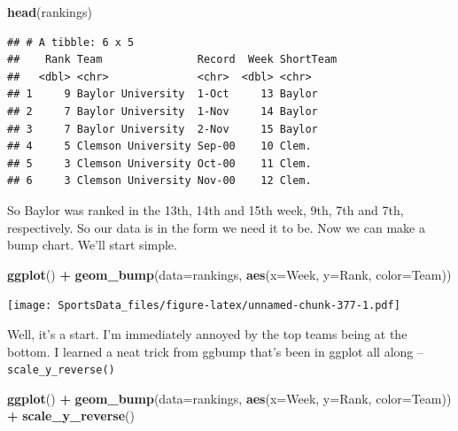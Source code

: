 \documentclass[
]{book}
\newenvironment{Shaded}{\begin{snugshade}}{\end{snugshade}}
\newcommand{\DataTypeTok}[1]{\textcolor[rgb]{0.13,0.29,0.53}{#1}}
\newcommand{\KeywordTok}[1]{\textcolor[rgb]{0.13,0.29,0.53}{\textbf{#1}}}
\newcommand{\NormalTok}[1]{#1}
\newcommand{\OperatorTok}[1]{\textcolor[rgb]{0.81,0.36,0.00}{\textbf{#1}}}
\newcommand{\StringTok}[1]{\textcolor[rgb]{0.31,0.60,0.02}{#1}}
\begin{document}
\begin{Shaded}
\begin{Highlighting}[]
\KeywordTok{head}\NormalTok{(rankings)}
\end{Highlighting}
\end{Shaded}

\begin{verbatim}
## # A tibble: 6 x 5
##    Rank Team               Record  Week ShortTeam
##   <dbl> <chr>              <chr>  <dbl> <chr>    
## 1     9 Baylor University  1-Oct     13 Baylor   
## 2     7 Baylor University  1-Nov     14 Baylor   
## 3     7 Baylor University  2-Nov     15 Baylor   
## 4     5 Clemson University Sep-00    10 Clem.    
## 5     3 Clemson University Oct-00    11 Clem.    
## 6     3 Clemson University Nov-00    12 Clem.
\end{verbatim}

So Baylor was ranked in the 13th, 14th and 15th week, 9th, 7th and 7th, respectively. So our data is in the form we need it to be. Now we can make a bump chart. We'll start simple.

\begin{Shaded}
\begin{Highlighting}[]
\KeywordTok{ggplot}\NormalTok{() }\OperatorTok{+}\StringTok{ }\KeywordTok{geom_bump}\NormalTok{(}\DataTypeTok{data=}\NormalTok{rankings, }\KeywordTok{aes}\NormalTok{(}\DataTypeTok{x=}\NormalTok{Week, }\DataTypeTok{y=}\NormalTok{Rank, }\DataTypeTok{color=}\NormalTok{Team))}
\end{Highlighting}
\end{Shaded}

\texttt{[image: SportsData\_files/figure-latex/unnamed-chunk-377-1.pdf]}

Well, it's a start. I'm immediately annoyed by the top teams being at the bottom. I learned a neat trick from ggbump that's been in ggplot all along -- \texttt{scale\_y\_reverse()}

\begin{Shaded}
\begin{Highlighting}[]
\KeywordTok{ggplot}\NormalTok{() }\OperatorTok{+}\StringTok{ }\KeywordTok{geom_bump}\NormalTok{(}\DataTypeTok{data=}\NormalTok{rankings, }\KeywordTok{aes}\NormalTok{(}\DataTypeTok{x=}\NormalTok{Week, }\DataTypeTok{y=}\NormalTok{Rank, }\DataTypeTok{color=}\NormalTok{Team)) }\OperatorTok{+}\StringTok{ }\KeywordTok{scale_y_reverse}\NormalTok{()}
\end{Highlighting}
\end{Shaded}
\end{document}
